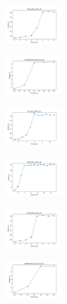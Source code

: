 \begin{figure}[H]
\begin{subfigure}
        \centering
        \includegraphics[width=0.234\textwidth]{img/es/rand_set_const_10_277451237_time.png}
    \end{subfigure}
    \hfill
    \begin{subfigure}
        \centering
        \includegraphics[width=0.234\textwidth]{img/es/newthyroid_set_const_10_277451237_time.png}
    \end{subfigure}
    \hfill
    \begin{subfigure}
        \centering
        \includegraphics[width=0.234\textwidth]{img/es/iris_set_const_10_49258669_time.png}
    \end{subfigure}
    \hfill
    \begin{subfigure}
        \centering
        \includegraphics[width=0.234\textwidth]{img/es/ecoli_set_const_10_49258669_time.png}
    \end{subfigure}
    \hfill
    \begin{subfigure}
        \centering
        \includegraphics[width=0.234\textwidth]{img/es/rand_set_const_10_49258669_time.png}
    \end{subfigure}
    \hfill
    \begin{subfigure}
        \centering
        \includegraphics[width=0.234\textwidth]{img/es/newthyroid_set_const_10_49258669_time.png}

\end{subfigure}
\end{figure}
